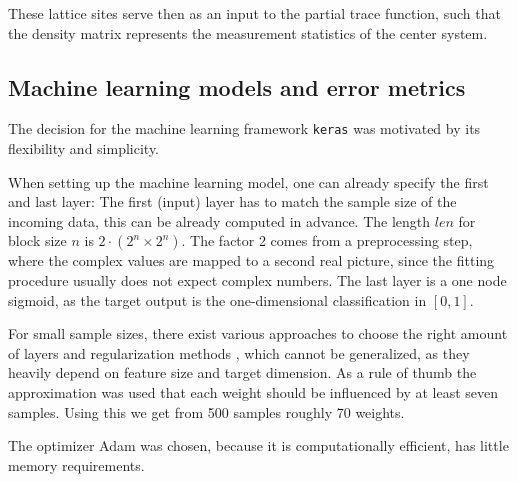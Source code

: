 \documentclass[reprint,amsmath,amssymb,aps,prb]{revtex4-2}
\begin{document}
These lattice sites serve then as an input to the partial trace function, such that the density matrix represents the measurement statistics of the center system.

\subsection{Machine learning models and error metrics}\label{sec:nn}

The decision for the machine learning framework \texttt{keras} was motivated by its flexibility and simplicity. \cite{chollet2015keras}

When setting up the machine learning model, one can already specify the first and last layer: The first (input) layer has to match the sample size of the incoming data, this can be already computed in advance. The length $len$ for block size $n$ is $2\cdot\left(2^n\times 2^n \right)$. The factor 2 comes from a preprocessing step, where the complex values are mapped to a second real picture, since the fitting procedure usually does not expect complex numbers. The last layer is a one node sigmoid, as the target output is the one-dimensional classification in $\left[0,1\right]$.

For small sample sizes, there exist various approaches to choose the right amount of layers and regularization methods \cite{Olson2018,Feng2019}, which cannot be generalized, as they heavily depend on feature size and target dimension. As a rule of thumb the approximation was used that each weight should be influenced by at least seven samples. Using this we get from 500 samples roughly 70 weights.


The optimizer Adam was chosen, because it is computationally efficient,
has little memory requirements. \cite{Kingma2014}
\end{document}
